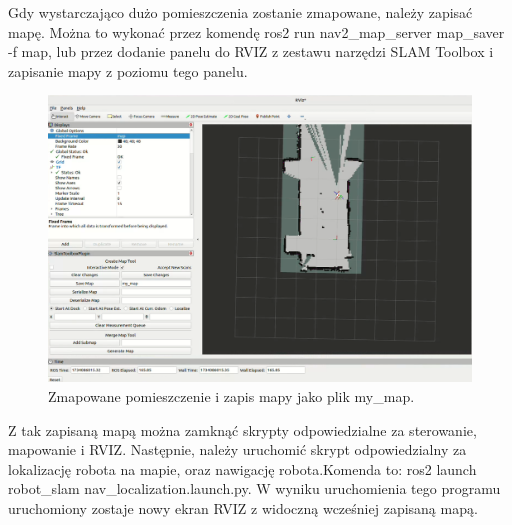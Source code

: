 \documentclass[a4paper,twoside,12pt]{book}
\begin{document}
\newpage
Gdy wystarczająco dużo pomieszczenia zostanie zmapowane, należy zapisać mapę. Można to wykonać przez komendę ros2 run nav2\_map\_server map\_saver -f map, lub przez dodanie panelu do RVIZ z zestawu narzędzi SLAM Toolbox i zapisanie mapy z poziomu tego panelu.

\begin{figure}[!hb]
	\centering
	\includegraphics[width=1\textwidth]{images/save-map.png}
	\caption{Zmapowane pomieszczenie i zapis mapy jako plik my\_map.}
	\label{fig:save-map}
\end{figure}
\newpage
Z tak zapisaną mapą można zamknąć skrypty odpowiedzialne za sterowanie, mapowanie i RVIZ.
\newline\newline
Następnie, należy uruchomić skrypt odpowiedzialny za lokalizację robota na mapie, oraz nawigację robota.\newline Komenda to: ros2 launch robot\_slam nav\_localization.launch.py. 
W wyniku uruchomienia tego programu uruchomiony zostaje nowy ekran RVIZ z widoczną wcześniej zapisaną mapą.
\end{document}
